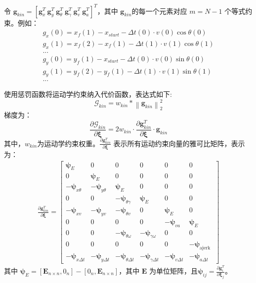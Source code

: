 \documentclass[master,academic]{ysuthesis} %
\begin{document}
		令 $\bm{g}_{kin} = [\bm{g}_x^T\ \bm{g}_y^T\ \bm{g}_\theta^T\ \bm{g}_\gamma^T\ \bm{g}_v^T\ \bm{g}_a^T]^T$，其中 $\bm{g}_{kin}$的每一个元素对应 $m = N-1$ 个等式约束。例如：
		\begin{equation}
			\begin{aligned}
				g_{x}( 0 ) =x_f( 1 ) -x_{start}-\Delta t( 0 ) \cdot v( 0 ) \cos \theta( 0 ) \\
				g_{x}( 1 ) =x_f( 2 ) -x_f( 1 ) -\Delta t( 1 ) \cdot v( 1 ) \cos \theta ( 1 ) \\
				...\\
				g_{y}( 0 ) =y_f( 1 ) -x_{start}-\Delta t( 0 ) \cdot v( 0 ) \sin \theta ( 0 ) \\
				g_{y}( 1 ) =y_f( 2 ) -y_f( 1 ) -\Delta t( 1 ) \cdot v( 1 ) \sin \theta ( 1 ) \\
				...
			\end{aligned}   
		\end{equation}

		使用惩罚函数将运动学约束纳入代价函数，表达式如下:
		\begin{equation}
			\mathcal{G}_{kin} = w_{kin}*\left \| \bm{g}_{kin} \right \|_2^2 \label{Gkin}
		\end{equation}
		梯度为：
		\begin{equation}
			\frac{\partial\mathcal{G}_{kin}}{\partial\bm{\xi}}=2w_{kin}\cdot\frac{\partial \bm{g}_{kin}^T}{\partial\bm{\xi}}\cdot \bm{g}_{kin}\label{18}
		\end{equation}
		其中，$w_{kin}$为运动学约束权重。\(\frac{\partial \bm{g}_{kin}^T}{\partial \bm{\xi}}\) 表示所有运动约束向量的雅可比矩阵，表示为：
		\begin{equation}
			\begin{array}{c}
				\frac{\partial \bm{g}_{kin}^{T}}{\partial \bm{\xi}}= 
				{\left[\begin{array}{cccccc}
						\bm{\psi}_{E} & 0 & 0 & 0 & 0 & 0 \\
						0 & \bm{\psi}_{E} & 0 & 0 & 0 & 0 \\
						-\bm{\psi}_{x \theta} & -\bm{\psi}_{y \theta} & \bm{\psi}_{E} & 0 & 0 & 0 \\
						0 & 0 & -\bm{\psi}_{\theta \gamma} & \bm{\psi}_{E} & 0 & 0 \\
						-\bm{\psi}_{x v} & -\bm{\psi}_{y v} & -\bm{\psi}_{\theta v} & 0 & \bm{\psi}_{E} & 0 \\
						0 & 0 & 0 & 0 & -\bm{\psi}_{v a} & \bm{\psi}_{E} \\
						0 & 0 & -\bm{\psi}_{\theta \omega} & -\bm{\psi}_{\gamma \omega} & 0 & 0 \\
						0 & 0 & 0 & 0 & 0 & -\bm{\psi}_{\text {ajerk }} \\
						-\bm{\psi}_{x \Delta t} & -\bm{\psi}_{y \Delta t} & -\bm{\psi}_{\theta \Delta t} & -\bm{\psi}_{\gamma \Delta t} & -\bm{\psi}_{v \Delta t} & -\bm{\psi}_{a \Delta t}
					\end{array}\right]}
			\end{array}
			\label{eq:运动学约束的雅可比}
		\end{equation}
		其中 $\bm{\psi}_E = [\bm{E}_{n \times n}, 0_n] - [0_n, \bm{E}_{n \times n}]$，其中 $\bm{E}$ 为单位矩阵，且\(\bm{\psi}_{ij} = \frac{\partial \bm{g}^T_{i}}{\partial \bm{\xi}_j}\)。
\end{document}
